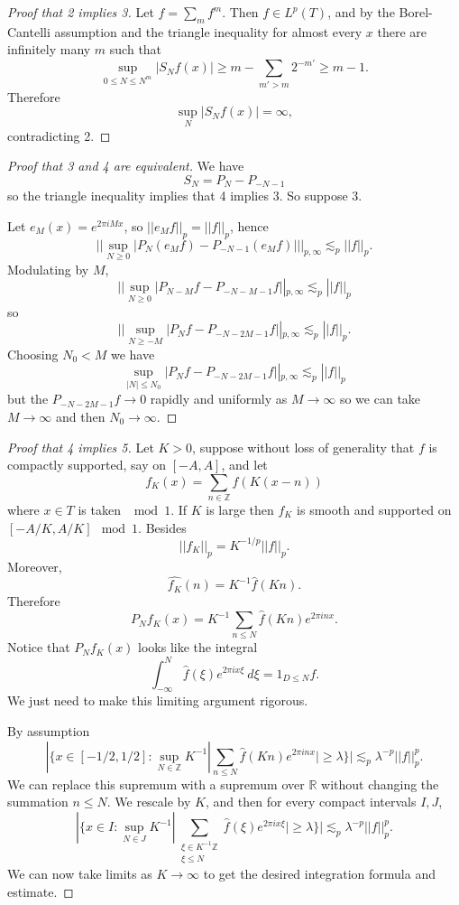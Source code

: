 \documentclass[12pt]{report}
\newcommand{\ZZ}{\mathbb{Z}}
\newcommand{\RR}{\mathbb{R}}
\theoremstyle{definition}
\begin{document}
\begin{proof}[Proof that 2 implies 3]
Let $f = \sum_m f^m$. Then $f \in L^p(T)$, and by the Borel-Cantelli assumption and the triangle inequality for almost every $x$ there are infinitely many $m$ such that
$$\sup_{0 \leq N \leq N^m} |S_Nf(x)| \geq m - \sum_{m' > m} 2^{-m'} \geq m - 1.$$
Therefore
$$\sup_N |S_Nf(x)| = \infty,$$
contradicting 2.
\end{proof}

\begin{proof}[Proof that 3 and 4 are equivalent]
We have
$$S_N = P_N - P_{-N-1}$$
so the triangle inequality implies that 4 implies 3. So suppose 3.

Let $e_M(x) = e^{2\pi iMx}$, so $||e_Mf||_p = ||f||_p$, hence
$$||\sup_{N \geq 0} |P_N(e_Mf) - P_{-N-1}(e_Mf)|||_{p, \infty} \lesssim_p ||f||_p.$$
Modulating by $M$,
$$||\sup_{N \geq 0} |P_{N-M}f - P_{-N-M-1}f||_{p, \infty} \lesssim_p ||f||_p$$
so
$$||\sup_{N \geq -M} |P_Nf - P_{-N-2M-1}f||_{p, \infty} \lesssim_p ||f||_p.$$
Choosing $N_0 < M$ we have
$$\sup_{|N| \leq N_0} |P_Nf - P_{-N-2M-1}f||_{p, \infty} \lesssim_p ||f||_p$$
but the $P_{-N-2M-1}f \to 0$ rapidly and uniformly as $M \to \infty$ so we can take $M \to \infty$ and then $N_0 \to \infty$.
\end{proof}

\begin{proof}[Proof that 4 implies 5]
Let $K > 0$, suppose without loss of generality that $f$ is compactly supported, say on $[-A, A]$, and let
$$f_K(x) = \sum_{n \in \ZZ} f(K(x - n))$$
where $x \in T$ is taken $\mod 1$.
If $K$ is large then $f_K$ is smooth and supported on $[-A/K, A/K] \mod 1$. Besides
$$||f_K||_p = K^{-1/p} ||f||_p.$$
Moreover,
$$\widehat{f_K}(n) = K^{-1}\hat f(Kn).$$
Therefore
$$P_Nf_K(x) = K^{-1}\sum_{n \leq N} \hat f(Kn)e^{2\pi inx}.$$
Notice that $P_Nf_K(x)$ looks like the integral
$$\int_{-\infty}^N \hat f(\xi) e^{2\pi ix\xi} ~d\xi = 1_{D \leq N} f.$$
We just need to make this limiting argument rigorous.

By assumption
$$|\{x \in [-1/2, 1/2]: \sup_{N \in \ZZ} K^{-1}|\sum_{n \leq N} \hat f(Kn)e^{2\pi inx}| \geq \lambda\}| \lesssim_p \lambda^{-p} ||f||_p^p.$$
We can replace this supremum with a supremum over $\RR$ without changing the summation $n \leq N$. We rescale by $K$, and then for every compact intervals $I, J$,
$$|\{x \in I: \sup_{N \in J} K^{-1} |\sum_{\substack{\xi \in K^{-1}\ZZ\\\xi \leq N}} \hat f(\xi)e^{2\pi ix\xi}| \geq \lambda\}| \lesssim_p \lambda^{-p}||f||_p^p.$$
We can now take limits as $K \to \infty$ to get the desired integration formula and estimate.
\end{proof}
\end{document}
